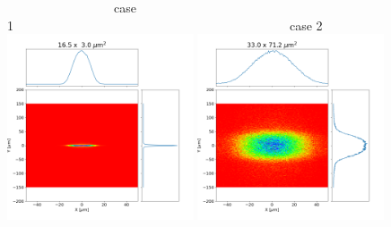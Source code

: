 \documentclass[]{article}
\begin{document}
  

\thispagestyle{empty}



\begin{figure}
    ~~~~~~~~~~~~~~~~~case 1~~~~~~~~~~~~~~~~~~~~~~~~~~~~~~~~~~~~~~~~~~~~case 2\\
    \includegraphics[width=0.49\textwidth]{figures/case1_hybrid.png}
    \includegraphics[width=0.49\textwidth]{figures/case2_hybrid.png}\\
    

\end{figure}
\end{document}
